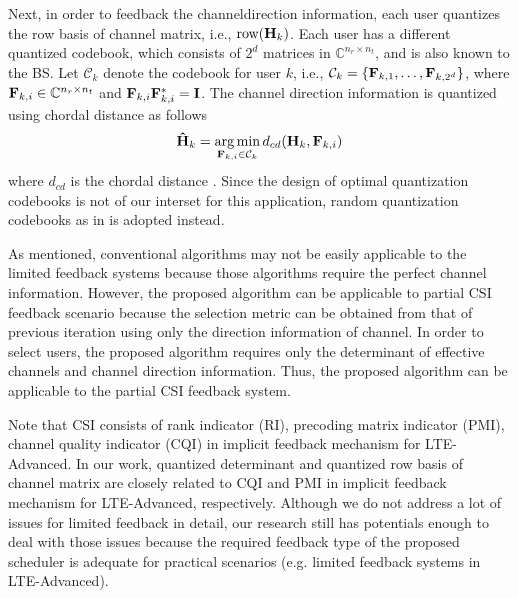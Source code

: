 \documentclass[journal,twoside]{IEEEtranTCOM}
\begin{document}
Next, in order to feedback the  channeldirection information, each user quantizes the row basis of channel matrix, i.e., $\textrm{row}({\bf{H}}_k)$. Each user has a different quantized codebook, which consists of $2^{d}$ matrices in ${\mathbb{C}}^{n_r \times n_t}$, and is also known to the BS. Let $\mathcal{C}_k$ denote the codebook for user $k$, i.e., $\mathcal{C}_k=\{ {{\bf{F}}_{k,1}}, \ldots, {{\bf{F}}_{k,2^{d}}} \}$, where ${{\bf{F}}_{k,i}} \in {\mathbb{C}}^{n_r \times n_t}$ and ${{\bf{F}}_{k,i}} {{\bf{F}}_{k,i}^*} = \bf{I}$.
The channel direction information is quantized using chordal distance as follows
\begin{equation}
{{\bf{\hat H}}_k} = \mathop {\arg \min }\limits_{{{\bf{F}}_{k,i}} \in {\mathcal{C}_k}} {d_{cd}}({{\bf{H}}_k},{{\bf{F}}_{k,i}})
\end{equation}
where $d_{cd}$ is the chordal distance \cite{CD_conf}. Since the design of optimal quantization codebooks is not of our interset for this application,  random quantization codebooks as in \cite{RandomCDICodebook} is adopted instead.

As mentioned, conventional algorithms  may not be easily applicable to the limited feedback systems because those algorithms require the perfect channel information. However, the proposed algorithm can be applicable to partial CSI feedback scenario because the selection metric can be obtained from that of previous iteration using only the direction information of channel. In order to select users, the proposed algorithm requires only the determinant of effective channels and channel direction information. Thus, the proposed algorithm can be applicable to the partial CSI feedback system.

Note that CSI consists of rank indicator (RI), precoding matrix indicator (PMI), channel quality indicator (CQI) in implicit feedback mechanism for LTE-Advanced. In our work, quantized determinant and quantized row basis of channel matrix are closely related to CQI and PMI in implicit feedback mechanism for LTE-Advanced, respectively. Although we do not address a lot of issues for limited feedback in detail, our research still has potentials enough to deal with those issues because the required feedback type of the proposed scheduler is adequate for practical scenarios (e.g. limited feedback systems in LTE-Advanced).

\end{document}
